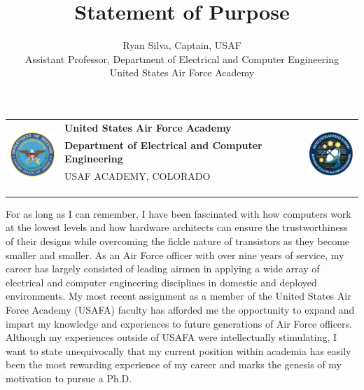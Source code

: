 \documentclass{article}
\begin{document}
\noindent \begin{tabu} to \textwidth{l X[c] r}
 & 
\textbf{United States Air Force Academy} &  
\\
& \textbf{Department of Electrical and Computer Engineering} & \\
& \tiny{USAF ACADEMY, COLORADO}\\
\\ \\ \\
\end{tabu}

\title{Statement of Purpose}
\author{Ryan Silva, Captain, USAF\\Assistant Professor, Department of
Electrical and Computer Engineering\\United States Air Force Academy}
\date{}
{\let\newpage\relax\maketitle}

For as long as I can remember, I have been fascinated with how computers work
at the lowest levels and how hardware architects can ensure the trustworthiness
of their designs while overcoming the
fickle nature of transistors as they become smaller and smaller. 
As an Air Force officer with over nine years of service, my career has largely consisted of
leading airmen in applying a wide array of electrical and computer
engineering disciplines in domestic and deployed environments. My most
recent assignment as a member of the United States Air Force 
Academy (USAFA) faculty has afforded me the opportunity to expand and impart my knowledge and
experiences to future generations of Air Force officers. Although my
experiences outside of USAFA were
intellectually stimulating, I want to state
unequivocally that my current position within academia has easily been the most
rewarding experience of my career and marks the genesis of my motivation to pursue
a Ph.D. 
\end{document}
